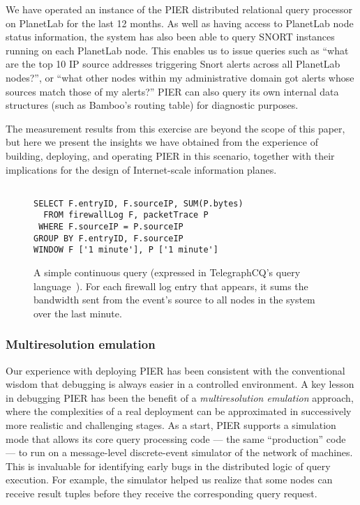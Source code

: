 \documentclass[10pt,twocolumn]{MyTightStyle}
\begin{document}
We have operated an instance of the PIER distributed relational query
processor on PlanetLab for the last 12 months.  As well as having
access to PlanetLab node status information, the system has also been
able to query SNORT instances running on each PlanetLab node.  This
enables us to issue queries such as ``what are the top 10 IP source
addresses triggering Snort alerts across all PlanetLab nodes?'', or
``what other nodes within my administrative domain got
alerts whose sources match those of my alerts?''
PIER can also query its own internal data structures (such as
Bamboo's routing table) for diagnostic purposes. 

The measurement results from this exercise are beyond the scope of
this paper, but here we present the insights we have obtained from the
experience of building, deploying, and operating PIER in this
scenario, together with their implications for the design of
Internet-scale information planes. 

\begin{figure}
{\small
\begin{verbatim}

SELECT F.entryID, F.sourceIP, SUM(P.bytes)
  FROM firewallLog F, packetTrace P
 WHERE F.sourceIP = P.sourceIP
GROUP BY F.entryID, F.sourceIP
WINDOW F ['1 minute'], P ['1 minute']
\end{verbatim}
}
\caption[Simple query]{A simple continuous query (expressed in TelegraphCQ's query
  language~\cite{Krishnamurthy2003}). For each firewall log
  entry that appears, it sums the bandwidth sent from the event's
  source to all nodes in the system over the last minute.}
\label{fig:query}
\end{figure}

\subsubsection*{Multiresolution emulation}

Our experience with deploying PIER has been consistent with the
conventional wisdom that debugging is always easier in a controlled
environment.  A key lesson in debugging PIER has been the benefit of a
{\em multiresolution emulation} approach, where the complexities of a
real deployment can be approximated in successively more realistic and
challenging stages.  As a start, PIER supports a simulation mode that
allows its core query processing code --- the same ``production'' code
--- to run on a message-level discrete-event simulator of the network
of machines.  This is invaluable for
identifying early bugs in the distributed
logic of query execution.  For example, the simulator helped us realize
that some nodes can receive result tuples before they
receive the corresponding query request.
\end{document}
